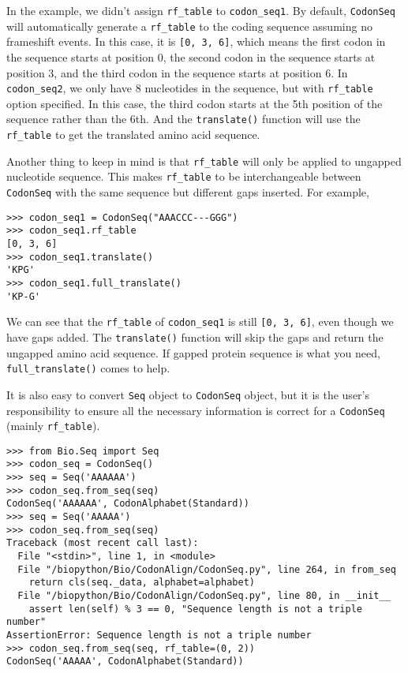 \documentclass{article}
\begin{document}
In the example, we didn't assign \texttt{rf\_table} to
\texttt{codon\_seq1}. By default, \texttt{CodonSeq} will automatically
generate a \texttt{rf\_table} to the coding sequence assuming no
frameshift events. In this case, it is \texttt{{[}0, 3, 6{]}}, which
means the first codon in the sequence starts at position 0, the second
codon in the sequence starts at position 3, and the third codon in the
sequence starts at position 6. In \texttt{codon\_seq2}, we only have 8
nucleotides in the sequence, but with \texttt{rf\_table} option
specified. In this case, the third codon starts at the 5th position of
the sequence rather than the 6th. And the \texttt{translate()} function
will use the \texttt{rf\_table} to get the translated amino acid
sequence.

Another thing to keep in mind is that \texttt{rf\_table} will only be
applied to ungapped nucleotide sequence. This makes \texttt{rf\_table}
to be interchangeable between \texttt{CodonSeq} with the same sequence
but different gaps inserted. For example,

\begin{verbatim}
>>> codon_seq1 = CodonSeq("AAACCC---GGG")
>>> codon_seq1.rf_table
[0, 3, 6]
>>> codon_seq1.translate()
'KPG'
>>> codon_seq1.full_translate()
'KP-G'
\end{verbatim}

We can see that the \texttt{rf\_table} of \texttt{codon\_seq1} is still
\texttt{{[}0, 3, 6{]}}, even though we have gaps added. The
\texttt{translate()} function will skip the gaps and return the ungapped
amino acid sequence. If gapped protein sequence is what you need,
\texttt{full\_translate()} comes to help.

It is also easy to convert \texttt{Seq} object to \texttt{CodonSeq}
object, but it is the user's responsibility to ensure all the necessary
information is correct for a \texttt{CodonSeq} (mainly
\texttt{rf\_table}).

\begin{verbatim}
>>> from Bio.Seq import Seq
>>> codon_seq = CodonSeq()
>>> seq = Seq('AAAAAA')
>>> codon_seq.from_seq(seq)
CodonSeq('AAAAAA', CodonAlphabet(Standard))
>>> seq = Seq('AAAAA')
>>> codon_seq.from_seq(seq)
Traceback (most recent call last):
  File "<stdin>", line 1, in <module>
  File "/biopython/Bio/CodonAlign/CodonSeq.py", line 264, in from_seq
    return cls(seq._data, alphabet=alphabet)
  File "/biopython/Bio/CodonAlign/CodonSeq.py", line 80, in __init__
    assert len(self) % 3 == 0, "Sequence length is not a triple number"
AssertionError: Sequence length is not a triple number
>>> codon_seq.from_seq(seq, rf_table=(0, 2))
CodonSeq('AAAAA', CodonAlphabet(Standard))
\end{verbatim}
\end{document}
